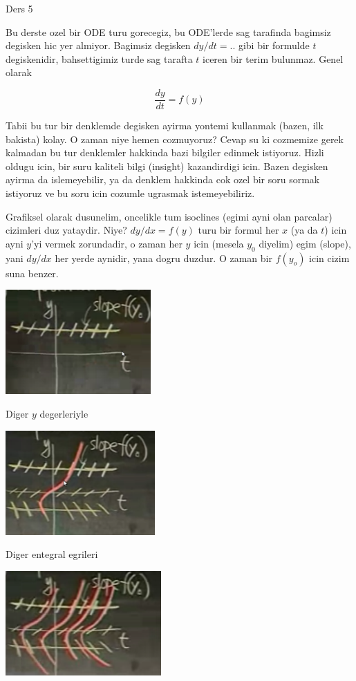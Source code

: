 \documentclass[12pt,fleqn]{article}
\begin{document}
Ders 5

Bu derste ozel bir ODE turu gorecegiz, bu ODE'lerde sag tarafinda bagimsiz
degisken hic yer almiyor. Bagimsiz degisken $dy/dt = ..$ gibi bir formulde
$t$ degiskenidir, bahsettigimiz turde sag tarafta $t$ iceren bir terim
bulunmaz. Genel olarak

\[ \frac{dy}{dt} = f(y) \]

Tabii bu tur bir denklemde degisken ayirma yontemi kullanmak (bazen, ilk
bakista) kolay. O zaman niye hemen cozmuyoruz? Cevap su ki cozmemize gerek
kalmadan bu tur denklemler hakkinda bazi bilgiler edinmek istiyoruz. Hizli
oldugu icin, bir suru kaliteli bilgi (insight) kazandirdigi icin. Bazen
degisken ayirma da islemeyebilir, ya da denklem hakkinda cok ozel bir soru
sormak istiyoruz ve bu soru icin cozumle ugrasmak istemeyebiliriz.

Grafiksel olarak dusunelim, oncelikle tum isoclines (egimi ayni olan
parcalar) cizimleri duz yataydir. Niye? $dy/dx = f(y)$ turu bir formul her
$x$ (ya da $t$) icin ayni $y$'yi vermek zorundadir, o zaman her $y$ icin (mesela $y_0$
diyelim) egim (slope), yani $dy/dx$ her yerde aynidir, yana dogru duzdur. O
zaman bir $f(y_o)$ icin cizim suna benzer.

\includegraphics[height=4cm]{5_1.png}

Diger $y$ degerleriyle

\includegraphics[height=4cm]{5_2.png}

Diger entegral egrileri

\includegraphics[height=4cm]{5_3.png}
\end{document}
